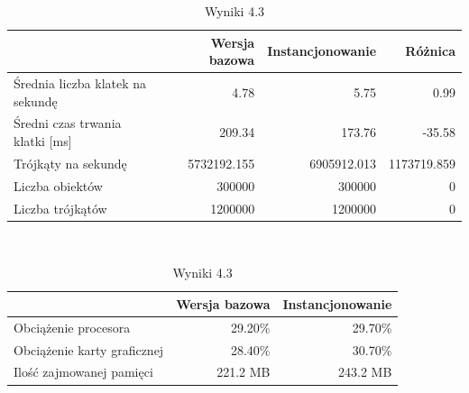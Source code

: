 \documentclass[a4paper,twoside,12pt]{book}
\begin{document}
\begin{table}[H]
    \centering
    \caption{Wyniki 4.3}
    \label{tab:instancing_test3}
    \begin{tabular}{|l||r|r|r|}
        \hline
        & Wersja bazowa & Instancjonowanie & Różnica \\
        \hline
        Średnia liczba klatek na sekundę & 4.78 & 5.75 & 0.99 \\
        \hline
        Średni czas trwania klatki [ms] & 209.34 & 173.76 & -35.58 \\
        \hline
        Trójkąty na sekundę & 5732192.155 & 6905912.013 & 1173719.859 \\
        \hline
        Liczba obiektów & 300000 & 300000 & 0 \\
        \hline
        Liczba trójkątów & 1200000 & 1200000 & 0 \\
        \hline
    \end{tabular} \\
    
    \vspace*{0.5 cm}
    
    \begin{tabular}{|l||r|r|}
         \hline
        & Wersja bazowa & Instancjonowanie \\
         \hline
        Obciążenie procesora & 29.20\% & 29.70\% \\
        \hline
        Obciążenie karty graficznej & 28.40\% & 30.70\% \\
        \hline
        Ilość zajmowanej pamięci & 221.2 MB & 243.2 MB \\
        \hline
    \end{tabular}
\end{table}
\end{document}

